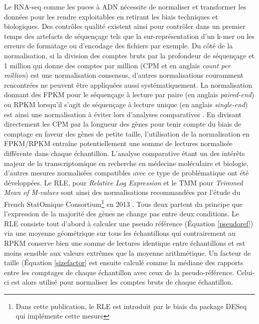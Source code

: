 Le RNA-seq comme les puces à ADN nécessite de normaliser et transformer les données pour les rendre exploitables en retirant les biais techniques et biologiques. Des contrôles qualité existent ainsi pour contrôler dans un premier temps des artefacts de séquençage tels que la sur-représentation d'un k-mer ou les erreurs de formatage ou d'encodage des fichiers par exemple. Du côté de la normalisation, si la division des comptes bruts par la profondeur de séquençage et 1 million qui donne des comptes par million (CPM et en anglais \textit{count per million}) est une normalisation consensus, d'autres normalisations couramment rencontrées ne peuvent être appliquées aussi systématiquement. La normalisation donnant des FPKM pour le séquençage à lecture par paire (en anglais \textit{paired-end}) ou RPKM lorsqu'il s'agit de séquençage à lecture unique (en anglais \textit{single-end}) est ainsi une normalisation à éviter lors d'analyses comparatives \cite{Wagner2012Dec}. En divisant directement les CPM par la longueur des gènes pour tenir compte du biais de comptage en faveur des gènes de petite taille, l'utilisation de la normalisation en FPKM/RPKM entraîne potentiellement une somme de lectures normalisée différente dans chaque échantillon. L'analyse comparative étant un des intérêts majeur de la transcriptomique en recherche en médecine moléculaire et biologie, d'autres mesures normalisées compatibles avec ce type de problématique ont été développées. Le RLE, pour \textit{Relative Log Expression} \cite{Anders2010Oct} et le TMM pour \textit{Trimmed Mean of M-values} \cite{Robinson2010Mar} sont ainsi des normalisations recommandées par l'étude du French StatOmique Consortium\footnote{Dans cette publication, le RLE est introduit par le biais du package DESeq \cite{Anders2010Oct} qui implémente cette mesure} en 2013 \cite{Dillies2013Nov}. Tous deux partent du principe que l'expression de la majorité des gènes ne change pas entre deux conditions. Le RLE consiste tout d'abord à calculer une pseudo référence (Équation \ref{pseudoref}) via une moyenne géométrique sur tous les échantillons \cite{Gandolfo2018Feb} qui contrairement au RPKM conserve bien une somme de lectures identique entre échantillons et est moins sensible aux valeurs extrêmes que la moyenne arithmétique. Un facteur de taille (Équation \ref{sizefactor} est ensuite calculé comme la médiane des rapports entre les comptages de chaque échantillon avec ceux de la pseudo-référence. Celui-ci est alors utilisé pour normaliser les comptes bruts de chaque échantillon.

